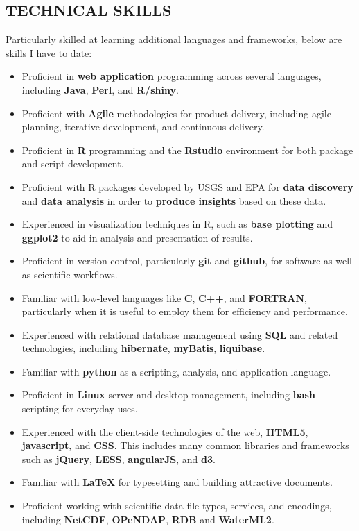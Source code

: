 \documentclass[line,margin]{res}
\begin{document}
\begin{resume}
\section{TECHNICAL SKILLS}
	Particularly skilled at learning additional languages and frameworks, below are skills I have to date:
\begin{itemize}
	\item Proficient in \textbf{web application} programming across several languages, including \textbf{Java}, \textbf{Perl}, and \textbf{R/shiny}.
	\item Proficient with \textbf{Agile} methodologies for product delivery, including agile planning, iterative development, and continuous delivery.
	\item Proficient in \textbf{R} programming and the \textbf{Rstudio} environment for both package and script development.
	\item Proficient with R packages developed by USGS and EPA for \textbf{data discovery} and \textbf{data analysis} in order to \textbf{produce insights} based on these data.
	\item Experienced in visualization techniques in R, such as \textbf{base plotting} and \textbf{ggplot2} to aid in analysis and presentation of results.
	\item Proficient in version control, particularly \textbf{git} and \textbf{github}, for software as well as scientific workflows.
	\item Familiar with low-level languages like \textbf{C}, \textbf{C++}, and \textbf{FORTRAN}, particularly when it is useful to employ them for efficiency and performance.
	\item Experienced with relational database management using \textbf{SQL} and related technologies, including \textbf{hibernate}, \textbf{myBatis}, \textbf{liquibase}.
	\item Familiar with \textbf{python} as a scripting, analysis, and application language.
	\item Proficient in \textbf{Linux} server and desktop management, including \textbf{bash} scripting for everyday uses.
	\item Experienced with the client-side technologies of the web, \textbf{HTML5}, \textbf{javascript}, and \textbf{CSS}.  This includes many common libraries and frameworks such as \textbf{jQuery}, \textbf{LESS}, \textbf{angularJS}, and \textbf{d3}.
	\item Familiar with \textbf{\LaTeX} for typesetting and building attractive documents.
	\item Proficient working with scientific data file types, services, and encodings, including \textbf{NetCDF}, \textbf{OPeNDAP}, \textbf{RDB} and \textbf{WaterML2}.

\end{itemize}
\end{resume}
\end{document}
